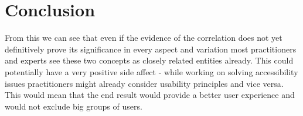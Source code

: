 \documentclass{thesis_proposal}
\begin{document}
\section{Conclusion}
From this we can see that even if the evidence of the correlation does not yet definitively prove its significance in every aspect and variation most practitioners and experts see these two concepts as closely related entities already. This could potentially have a very positive side affect - while working on solving accessibility issues practitioners might already consider usability principles and vice versa. This would mean that the end result would provide a better user experience and would not exclude big groups of users.

\pagebreak
\printbibliography{}
\end{document}
